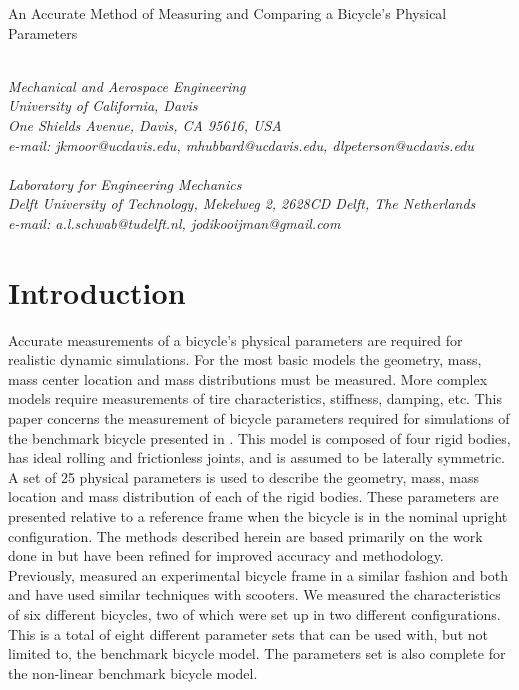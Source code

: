 \documentclass{bmd2010a}
\begin{document}
\begin{flushleft}
{\fontsize{16pt}{20pt}\selectfont%
  An Accurate Method of Measuring and Comparing a Bicycle's Physical Parameters\\}
\end{flushleft}

\begin{flushleft}
  {\\}
  \textit{Mechanical and Aerospace Engineering\\
          University of California, Davis\\
          One Shields Avenue, Davis, CA 95616, USA\\
          e-mail: jkmoor@ucdavis.edu, mhubbard@ucdavis.edu,
          dlpeterson@ucdavis.edu
  }\vspace{10pt}\\
  {\\}
  \textit{Laboratory for Engineering Mechanics\\
          Delft University of Technology, Mekelweg 2, 2628CD Delft, The
          Netherlands\\
          e-mail: a.l.schwab@tudelft.nl, jodikooijman@gmail.com
  }\vspace{10pt}\\
\end{flushleft}

\section*{Introduction}
Accurate measurements of a bicycle's physical parameters are required for
realistic dynamic simulations. For the most basic models the geometry, mass,
mass center location and mass distributions must be measured. More complex models
require measurements of tire characteristics, stiffness, damping, etc. This
paper concerns the measurement of bicycle parameters required for
simulations of the benchmark bicycle presented in \cite{Meijaard2007}. This
model is composed of four rigid bodies, has ideal rolling and frictionless joints,
and is assumed to be laterally symmetric. A set of 25
physical parameters is used to describe the geometry, mass, mass location and
mass distribution of each of the rigid bodies. These parameters are presented
relative to a reference frame when the bicycle is in the nominal upright
configuration. The methods described herein are based primarily on the work
done in \cite{Kooijman2006} but have been refined for improved accuracy and
methodology. Previously, \cite{Roland1971} measured an experimental bicycle frame in a
similar fashion and both \cite{Dohring1953} and \cite{Singh1971} have used
similar techniques with scooters. We measured the characteristics of six
different bicycles, two of which were set up in two different configurations.
This is a total of eight different parameter sets that can be used with, but not
limited to, the benchmark bicycle model. The parameters set is also complete
for the non-linear benchmark bicycle model.
\end{document}
